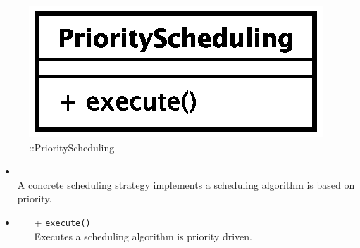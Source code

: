 \begin{figure}[h]
\centering
\includegraphics[scale=0.6,keepaspectratio]{images/solution/app/backend/priority_scheduling.eps}
\caption{\pScheduling::PriorityScheduling}
\label{fig:sd-app-scheduling-priority-scheduling}
\end{figure}
\FloatBarrier
\begin{itemize}
  \item \textbf{\descr} \\
    A concrete scheduling strategy implements a scheduling algorithm is based on priority.
  \item \textbf{\ops}
     \begin{itemize}
    \item[+] \texttt{execute()} \\
Executes a scheduling algorithm is priority driven.
  \end{itemize}
\end{itemize}
